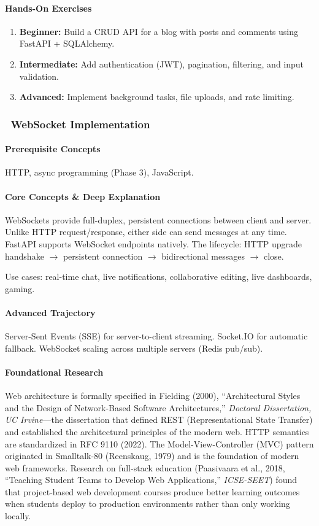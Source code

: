 \documentclass[11pt, a4paper, oneside]{report}
\newcommand{\mustmaster}[1]{\subsubsection{\texorpdfstring{\fcolorbox{blue!40!black}{blue!8}{\footnotesize\bfseries\color{blue!40!black} MUST MASTER}~#1}{#1}}}
\newcommand{\arrow}{$\rightarrow$}
\begin{document}
\paragraph{Hands-On Exercises}
\begin{enumerate}[leftmargin=*]
\item \textbf{Beginner:} Build a CRUD API for a blog with posts and comments using FastAPI + SQLAlchemy.
\item \textbf{Intermediate:} Add authentication (JWT), pagination, filtering, and input validation.
\item \textbf{Advanced:} Implement background tasks, file uploads, and rate limiting.
\end{enumerate}

\mustmaster{WebSocket Implementation}

\paragraph{Prerequisite Concepts} HTTP, async programming (Phase 3), JavaScript.

\paragraph{Core Concepts \& Deep Explanation} WebSockets provide full-duplex, persistent connections between client and server. Unlike HTTP request/response, either side can send messages at any time. FastAPI supports WebSocket endpoints natively. The lifecycle: HTTP upgrade handshake \arrow{} persistent connection \arrow{} bidirectional messages \arrow{} close.

Use cases: real-time chat, live notifications, collaborative editing, live dashboards, gaming.

\paragraph{Advanced Trajectory} Server-Sent Events (SSE) for server-to-client streaming. Socket.IO for automatic fallback. WebSocket scaling across multiple servers (Redis pub/sub).


\paragraph{Foundational Research} Web architecture is formally specified in Fielding (2000), ``Architectural Styles and the Design of Network-Based Software Architectures,'' \emph{Doctoral Dissertation, UC Irvine}---the dissertation that defined REST (Representational State Transfer) and established the architectural principles of the modern web. HTTP semantics are standardized in RFC 9110 (2022). The Model-View-Controller (MVC) pattern originated in Smalltalk-80 (Reenskaug, 1979) and is the foundation of modern web frameworks. Research on full-stack education (Paasivaara et al., 2018, ``Teaching Student Teams to Develop Web Applications,'' \emph{ICSE-SEET}) found that project-based web development courses produce better learning outcomes when students deploy to production environments rather than only working locally.
\end{document}
